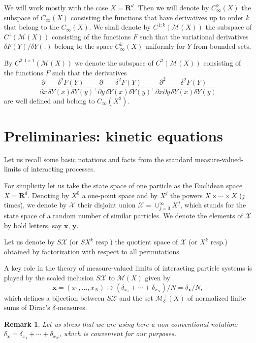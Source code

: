 \documentclass[12pt]{article}
\def\MC{\mathcal{M}}
\def\XC{\mathcal{X}}
\def\R{\mathbf{R}}
\def\x{\mathbf{x}}
\def\y{\mathbf{y}}
\def\pa{\partial}
\def\de{\delta}
\numberwithin{equation}{section}
\newtheorem{remark}{Remark}
\begin{document}
We will work mostly with the case $X=\R^d$. Then we will denote by  $C^k_{\infty}(X)$ the subspace of $C_{\infty}(X)$ consisting
the functions that have derivatives up to order $k$ that belong to the $C_{\infty}(X)$. We shall denote by $C^{1;k}(\MC(X))$
the subspace of $C^1(\MC(X))$ consisting of the functions  $F$
such that
the variational derivatives $\de F(Y)/ \de Y(.)$ belong to the space $C^k_{\infty}(X)$ uniformly for $Y$ from bounded sets.


By $C^{2;1\times 1}(\MC(X))$ we denote the subspace of $C^2(\MC(X))$ consisting of the functions $F$
such that
the derivatives
\[
\frac{\pa}{\pa x}\frac{\de^2F(Y)}{\de Y(x) \de Y(y)},
\frac{\pa}{\pa y}\frac{\de^2F(Y)}{\de Y(x) \de Y(y)},
\frac{\pa^2}{\pa x \pa y}\frac{\de^2F(Y)}{\de Y(x) \de Y(y)}
\]
are well defined and belong to $C_{\infty}(X^2)$.


\section{Preliminaries: kinetic equations}

Let us recall some basic notations and facts from the standard measure-valued-limits
 of interacting processes.

For simplicity let us take the state space of one particle as the Euclidean space $X=\R^d$.
Denoting by $X^0$ a one-point space and by $X^j$ the powers $X\times
\cdots \times X$ ($j$ times),
we denote by ${\cal X}$ their disjoint union
$\XC=\cup_{j=0}^{\infty} X^j$, which stands for the state
space of a random number of similar particles.
We denote the elements of $\XC$ by bold letters, say $\x$, $\y$.

Let us denote by  $S\XC$ (or $SX^k$ resp.) the quotient
space of $\XC$ (or $X^k$ resp.) obtained by factorization with
respect to all permutations.

A key role in the theory of measure-valued limits of interacting
particle systems is played by the scaled inclusion $S\XC$ to $\MC(X)$ given by
\begin{equation}
\label{eqcorrsetparticlesandmes}
 \x=(x_1,...,x_N) \mapsto
(\delta_{x_1}+\cdots +\delta_{x_N})/N=\delta_{\x}/N,
 \end{equation}
 which defines a bijection between $S\XC$ and the set
 $\MC^+_{\delta}(X)$ of normalized finite sums of Dirac's
 $\de$-measures.

\begin{remark}
Let us stress that we are using here a non-conventional notation:
 $\de_{\x}=\de_{x_1}+\cdots +\de_{x_N}$, which is convenient for our purposes.
\end{remark}
\end{document}
